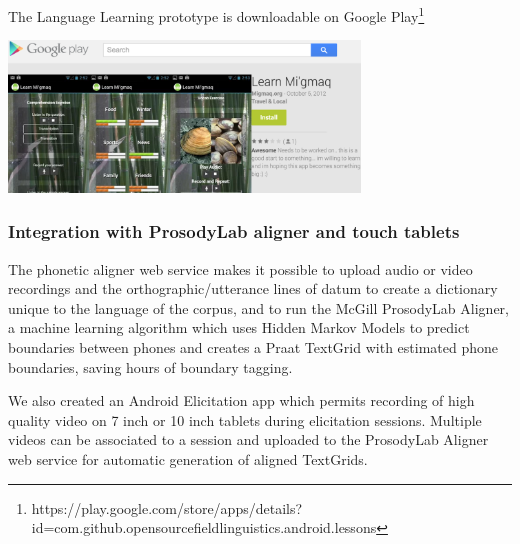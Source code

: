 \documentclass[letterpaper, 12pt, dvips]{mitwpl}
\begin{document}
\begin{exe} 
\ex The Language Learning prototype is downloadable on Google Play\footnote{https://play.google.com/store/apps/details?id=com.github.opensourcefieldlinguistics.android.lessons}

 \centering
   \includegraphics[width=0.7\textwidth]{languageLearningApp} 

\label{ex:languageLearningApp}
\end{exe}

\subsubsection{Integration with ProsodyLab aligner and touch tablets}
\label{sec:phoneticwebservice}

The phonetic aligner web service makes it possible to upload audio or video recordings and the orthographic/utterance lines of datum to create a dictionary unique to the language of the corpus,
and to run the McGill ProsodyLab Aligner,
a machine learning algorithm which uses Hidden Markov Models to predict boundaries between phones and creates a Praat TextGrid with estimated phone boundaries,
saving hours of boundary tagging.


We also created an Android Elicitation app which permits recording of high quality video on 7 inch or 10 inch tablets during elicitation sessions.
Multiple videos can be associated to a session and uploaded to the ProsodyLab Aligner web service for automatic generation of aligned TextGrids. 

%
\end{document}
